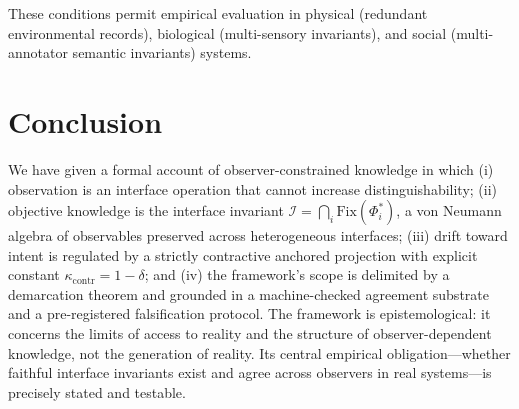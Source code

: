 \documentclass[11pt]{report}
\theoremstyle{plain}
\theoremstyle{definition}
\theoremstyle{remark}
\newcommand{\Iint}{\mathcal{I}}
\newcommand{\Fix}{\mathrm{Fix}}
\newcommand{\kcontr}{\kappa_{\mathrm{contr}}}
\begin{document}
These conditions permit empirical evaluation in physical (redundant environmental records),
biological (multi-sensory invariants), and social (multi-annotator semantic invariants)
systems.

\chapter{Conclusion}

We have given a formal account of observer-constrained knowledge in which (i) observation
is an interface operation that cannot increase distinguishability; (ii) objective knowledge
is the interface invariant $\Iint=\bigcap_i\Fix(\Phi_i^\ast)$, a von Neumann algebra of
observables preserved across heterogeneous interfaces; (iii) drift toward intent is regulated
by a strictly contractive anchored projection with explicit constant $\kcontr=1-\delta$; and
(iv) the framework's scope is delimited by a demarcation theorem and grounded in a
machine-checked agreement substrate and a pre-registered falsification protocol. The
framework is epistemological: it concerns the limits of access to reality and the structure
of observer-dependent knowledge, not the generation of reality. Its central empirical
obligation---whether faithful interface invariants exist and agree across observers in real
systems---is precisely stated and testable.
\end{document}
